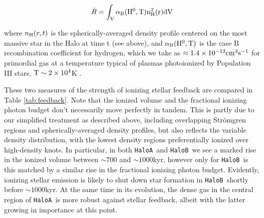 \documentclass[graphics, twocolumn, usenatbib]{mn2e}
\newcommand{\ha} {\texttt{HaloA~}}
\newcommand{\hb} {\texttt{HaloB~}}
\begin{document}
\begin{equation}
    \dot R = \int_{\rm{V}}\alpha_{\rm{B}}(\rm{H}^{0},T)n_{\rm{H}}^{2}(r)d\rm{V}
\end{equation}

\noindent where $n_{\rm{H}}(r, t)$ is the spherically-averaged density profile centered on the most massive star in the Halo at time t (see above), and $\alpha_{\rm{B}}(\rm{H}^{0},T)$ is the case B recombination coefficient for hydrogen, which we take as $\approx1.4\times 10^{-13}\rm{cm}^{3}\rm{s}^{-1}$ for primordial gas at a temperature typical of plasmas photoionized by Population III stars, $\rm{T}\sim 2\times 10^{4}$K \citep{Osterbrock2006, Johnson2012}. 

These two measures of the strength of ionizing stellar feedback are compared in Table \ref{tab:feedback}. Note that the ionized volume and the fractional ionizing photon budget don't necessarily move perfectly in tandem. This is partly due to our simplified treatment as described above, including overlapping Str{\" o}mgren regions and spherically-averaged density profiles, but also reflects the variable density distribution, with the lowest density regions preferentially ionized over high-density knots. In particular, in both \ha and \hb we see a marked rise in the ionized volume between $\sim 700$ and $\sim1000$kyr, however only for \hb is this matched by a similar rise in the fractional ionizing photon budget. Evidently, ionizing stellar emission is likely to shut down star formation in \hb shortly before $\sim 1000$kyr. At the same time in its evolution, the dense gas in the central region of \ha is more robust against stellar feedback, albeit with the latter growing in importance at this point.

 
\end{document}
